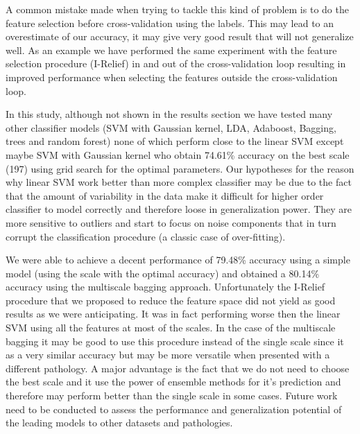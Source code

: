 \documentclass[12pt,journal,compsoc]{IEEEtran}
\begin{document}
A common mistake made when trying to tackle this kind of problem is to do the feature selection before cross-validation using the labels. This may lead to an overestimate of our accuracy, it may give very good result that will not generalize well. As an example we have performed the same experiment with the feature selection procedure (I-Relief) in and out of the cross-validation loop resulting in improved performance when selecting the features outside the cross-validation loop.

In this study, although not shown in the results section we have tested many other classifier models (SVM with Gaussian kernel, LDA, Adaboost, Bagging, trees and random forest) none of which perform close to the linear SVM except maybe SVM with Gaussian kernel who obtain 74.61\% accuracy on the best scale (197) using grid search for the optimal parameters. Our hypotheses for the reason why linear SVM work better than more complex classifier may be due to the fact that the amount of variability in the data make it difficult for higher order classifier to model correctly and therefore loose in generalization power. They are more sensitive to outliers and start to focus on noise components that in turn corrupt the classification procedure (a classic case of over-fitting).

We were able to achieve a decent performance of 79.48\% accuracy using a simple model (using the scale with the optimal accuracy) and obtained a 80.14\% accuracy using the multiscale bagging approach. Unfortunately the I-Relief procedure that we proposed to reduce the feature space did not yield as good results as we were anticipating. It was in fact performing worse then the linear SVM using all the features at most of the scales. In the case of the multiscale bagging it may be good to use this procedure instead of the single scale since it as a very similar accuracy but may be more versatile when presented with a different pathology. A major advantage is the fact that we do not need to choose the best scale and it use the power of ensemble methods for it's prediction and therefore may perform better than the single scale in some cases. Future work need to be conducted to assess the performance and generalization potential of the leading models to other datasets and pathologies.


\end{document}
